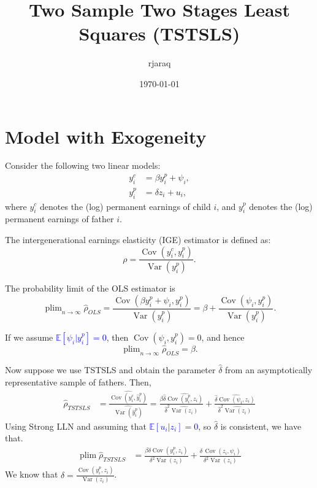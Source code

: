 \documentclass[12pt,oneside]{article}
\title{Two Sample Two Stages Least Squares (TSTSLS)}
\author{rjaraq}
\date{\today}
\DeclareMathOperator*{\plim}{plim}
\theoremstyle{bracket}
\begin{document}
\maketitle
\section{Model with Exogeneity}

Consider the following two linear models:
\begin{align}
    y_i^c &= \beta y_i^p + \psi_i, \\
    y_i^p &= \delta z_i + u_i,
\end{align}
where $y^{c}_i$ denotes the (log) permanent earnings of child $i$, and $y^{p}_i$ denotes the (log) permanent earnings of father $i$.

The intergenerational earnings elasticity (IGE) estimator is defined as:
\[
\rho = \frac{\operatorname{Cov}(y^c_i,y_i^p)}{\operatorname{Var}(y_i^p)}.
\]

The probability limit of the OLS estimator is
\[
\plim_{n\to \infty}\hat{\rho}_{OLS}
= \frac{\operatorname{Cov}(\beta y_i^p+\psi_i,y_i^p)}{\operatorname{Var}(y_i^p)}
= \beta + \frac{\operatorname{Cov}(\psi_i,y_i^p)}{\operatorname{Var}(y_i^p)}.
\]

If we assume \textcolor{blue}{$\mathbb{E}[\psi_i|y_i^p]=0$}, then $\operatorname{Cov}(\psi_i,y_i^p)=0$, and hence
\[
\plim_{n\to \infty}\hat{\rho}_{OLS} = \beta.
\]

Now suppose we use TSTSLS and obtain the parameter $\hat{\delta}$ from an asymptotically representative sample of fathers. Then,
\begin{align*}
\hat{\rho}_{TSTSLS} &=\frac{\widehat{\operatorname{Cov}(y^c_i,\hat{y}_i^p)}}{\widehat{\operatorname{Var}(\hat{y}_i^p)}}= \frac{\beta \hat{\delta} \widehat{\operatorname{Cov}(y_i^p,z_i)}}{\hat{\delta}^2\widehat{\operatorname{Var}(z_i)}}+\frac{\hat{\delta}\widehat{\operatorname{Cov}(\psi_i,z_i)}}{\hat{\delta}^2\widehat{\operatorname{Var}(z_i)}}
\end{align*}
Using Strong LLN and assuming that \textcolor{blue}{$\mathbb{E}[u_i|z_i]=0$}, so $\hat{\delta}$ is consistent, we have that.
\begin{align*}
\plim\hat{\rho}_{TSTSLS} &= \frac{\beta \delta\operatorname{Cov}(y_i^p,z_i)}{\delta^2\operatorname{Var}(z_i)}+ \frac{\delta\,\operatorname{Cov}(z_i,\psi_i)}{\delta^2\operatorname{Var}(z_i)}
\end{align*}
 We know that $\delta = \frac{\operatorname{Cov}(y_i^p,z_i)}{\operatorname{Var}(z_i)}$.
\end{document}
